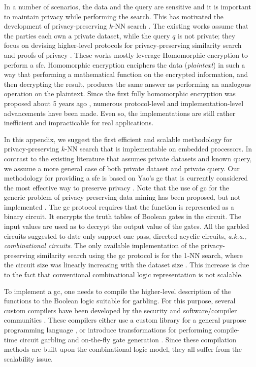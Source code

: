 In a number of scenarios, the data and the query are sensitive and it is important to maintain privacy while performing the search.
This has motivated the development of privacy-preserving $k$-NN search \cite{shaneck2009privacy}.
The existing works assume that the parties each own a private dataset, while the query $q$ is not private; they focus on devising higher-level protocols for privacy-preserving similarity search and proofs of privacy \cite{shaneck2009privacy,qi2008efficient}.
These works mostly leverage Homomorphic encryption to perform a \acrfull{sfe}.
Homomorphic encryption enciphers the data (\emph{plaintext}) in such a way that performing a mathematical function on the encrypted information, and then decrypting the result, produces the same answer as performing an analogous operation on the plaintext.
Since the first fully homomorphic encryption was proposed about 5 years ago \cite{gentry2009fully}, numerous protocol-level and implementation-level advancements have been made.
Even so, the implementations are still rather inefficient and impracticable for real applications.

In this appendix, we suggest the first efficient and scalable methodology for privacy-preserving $k$-NN search that is implementable on embedded processors.
In contrast to the existing literature that assumes private datasets and known query, we assume a more general case of both private dataset and private query.
Our methodology for providing a \acrshort{sfe} is based on Yao's \acrfull{gc} that is currently considered the most effective way to preserve privacy \cite{huang2012private,brenner2011hcrypt}.
Note that the use of \acrshort{gc} for the generic problem of privacy preserving data mining has been proposed, but not implemented \cite{agrawal2000privacy}.
The \acrshort{gc} protocol requires that the function is represented as a binary circuit.
It encrypts the truth tables of Boolean gates in the circuit.
The input values are used as to decrypt the output value of the gates.
All the garbled circuits suggested to date only support one pass, directed acyclic circuits, \emph{a.k.a., combinational circuits}.
The only available implementation of the privacy-preserving similarity search using the \acrshort{gc} protocol is for the 1-NN search, where the circuit size was linearly increasing with the dataset size \cite{kolesnikov2009improved}.
This increase is due to the fact that conventional combinational logic representation is not scalable.

To implement a \acrshort{gc}, one needs to compile the higher-level description of the functions to the Boolean logic suitable for garbling.
For this purpose, several custom compilers have been developed by the security and software/compiler communities \cite{malkhi2004fairplay,henecka2010tasty,holzer2012secure,kreuter2013pcf}.
These compilers either use a custom library for a general purpose programming language \cite{malkhi2004fairplay}, or introduce transformations for performing compile-time circuit garbling and on-the-fly gate generation \cite{kreuter2013pcf}.
Since these compilation methods are built upon the combinational logic model, they all suffer from the scalability issue.

